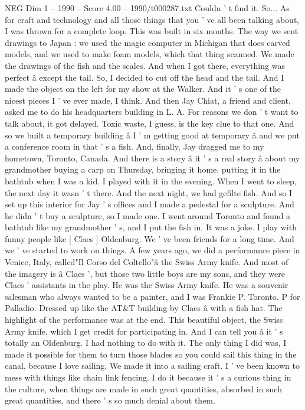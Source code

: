 \begin{textsample}{NEG Dim 1 – 1990 – Score 4.00 – 1990/t000287.txt}
Couldn ' t find it.
So...
As for craft and technology and all those things that you ' ve all been talking about, I was thrown for a complete loop.
This was built in six months.
The way we sent drawings to Japan : we used the magic computer in Michigan that does carved models, and we used to make foam models, which that thing scanned.
We made the drawings of the fish and the scales.
And when I got there, everything was perfect â except the tail.
So, I decided to cut off the head and the tail.
And I made the object on the left for my show at the Walker.
And it ' s one of the nicest pieces I ' ve ever made, I think.
And then Jay Chiat, a friend and client, asked me to do his headquarters building in L.
A.
For reasons we don ' t want to talk about, it got delayed.
Toxic waste, I guess, is the key clue to that one.
And so we built a temporary building â I ' m getting good at temporary â and we put a conference room in that ' s a fish.
And, finally, Jay dragged me to my hometown, Toronto, Canada.
And there is a story â it ' s a real story â about my grandmother buying a carp on Thursday, bringing it home, putting it in the bathtub when I was a kid.
I played with it in the evening.
When I went to sleep, the next day it wasn ' t there.
And the next night, we had gefilte fish.
And so I set up this interior for Jay ' s offices and I made a pedestal for a sculpture.
And he didn ' t buy a sculpture, so I made one.
I went around Toronto and found a bathtub like my grandmother ' s, and I put the fish in.
It was a joke.
I play with funny people like [ Claes ] Oldenburg.
We ' ve been friends for a long time.
And we ' ve started to work on things.
A few years ago, we did a performance piece in Venice, Italy, called"Il Corso del Coltello"â the Swiss Army knife.
And most of the imagery is â Claes ', but those two little boys are my sons, and they were Claes ' assistants in the play.
He was the Swiss Army knife.
He was a souvenir salesman who always wanted to be a painter, and I was Frankie P.
Toronto.
P for Palladio.
Dressed up like the AT\&T building by Claes â with a fish hat.
The highlight of the performance was at the end.
This beautiful object, the Swiss Army knife, which I get credit for participating in.
And I can tell you â it ' s totally an Oldenburg.
I had nothing to do with it.
The only thing I did was, I made it possible for them to turn those blades so you could sail this thing in the canal, because I love sailing.
We made it into a sailing craft.
I ' ve been known to mess with things like chain link fencing.
I do it because it ' s a curious thing in the culture, when things are made in such great quantities, absorbed in such great quantities, and there ' s so much denial about them.

\end{textsample}
